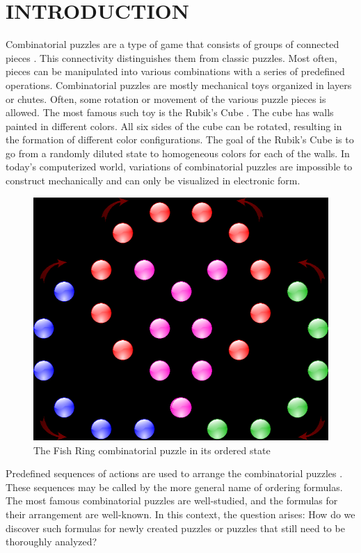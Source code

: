 \documentclass[a4paper,twocolumn,10pt]{article}
\begin{document}
\section{INTRODUCTION}

Combinatorial puzzles \cite{10.1007/3-540-44683-4_3} are a type of game that consists of groups of connected pieces \cite{sun2015computational}. This connectivity distinguishes them from classic puzzles. Most often, pieces can be manipulated into various combinations with a series of predefined operations. Combinatorial puzzles are mostly mechanical toys organized in layers or chutes. Often, some rotation or movement of the various puzzle pieces is allowed. The most famous such toy is the Rubik's Cube \cite{openai2019solving}. The cube has walls painted in different colors. All six sides of the cube can be rotated, resulting in the formation of different color configurations. The goal of the Rubik's Cube is to go from a randomly diluted state to homogeneous colors for each of the walls. In today's computerized world, variations of combinatorial puzzles are impossible to construct mechanically and can only be visualized in electronic form.

\begin{figure}
	\centering
	\includegraphics[width=1.0\linewidth]{figure01.png}
	\caption{The Fish Ring combinatorial puzzle in its ordered state}
	\label{figure01}
\end{figure}

Predefined sequences of actions are used to arrange the combinatorial puzzles \cite{8718565}. These sequences may be called by the more general name of ordering formulas. The most famous combinatorial puzzles are well-studied, and the formulas for their arrangement are well-known. In this context, the question arises: How do we discover such formulas for newly created puzzles or puzzles that still need to be thoroughly analyzed?
\end{document}
